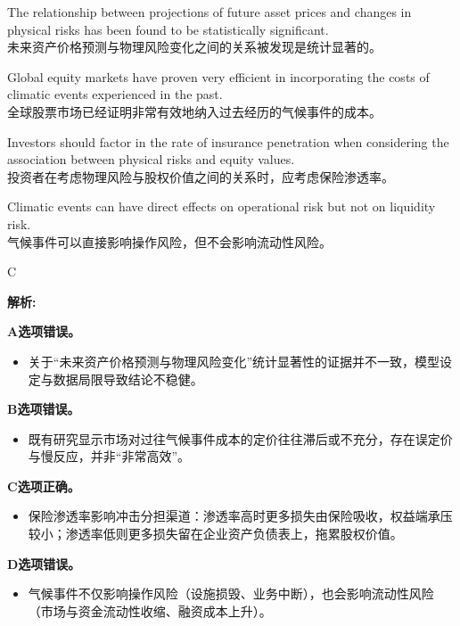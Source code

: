 \documentclass{article}
\newenvironment{explanation}
{\textbf{解析:}\par}
{\par}
\begin{document}
\begin{choices}
    \item The relationship between projections of future asset prices and changes in physical risks has been found to be statistically significant.\\未来资产价格预测与物理风险变化之间的关系被发现是统计显著的。
    \item Global equity markets have proven very efficient in incorporating the costs of climatic events experienced in the past.\\全球股票市场已经证明非常有效地纳入过去经历的气候事件的成本。
    \item Investors should factor in the rate of insurance penetration when considering the association between physical risks and equity values.\\投资者在考虑物理风险与股权价值之间的关系时，应考虑保险渗透率。
    \item Climatic events can have direct effects on operational risk but not on liquidity risk.\\气候事件可以直接影响操作风险，但不会影响流动性风险。
\end{choices}

\begin{correctanswer}
    C
\end{correctanswer}

\begin{explanation}
    \textbf{A选项错误。}
    \begin{itemize}
        \item 关于“未来资产价格预测与物理风险变化”统计显著性的证据并不一致，模型设定与数据局限导致结论不稳健。
    \end{itemize}

    \textbf{B选项错误。}
    \begin{itemize}
        \item 既有研究显示市场对过往气候事件成本的定价往往滞后或不充分，存在误定价与慢反应，并非“非常高效”。
    \end{itemize}

    \textbf{C选项正确。}
    \begin{itemize}
        \item 保险渗透率影响冲击分担渠道：渗透率高时更多损失由保险吸收，权益端承压较小；渗透率低则更多损失留在企业资产负债表上，拖累股权价值。
    \end{itemize}

    \textbf{D选项错误。}
    \begin{itemize}
        \item 气候事件不仅影响操作风险（设施损毁、业务中断），也会影响流动性风险（市场与资金流动性收缩、融资成本上升）。
    \end{itemize}
\end{explanation}
\end{document}
